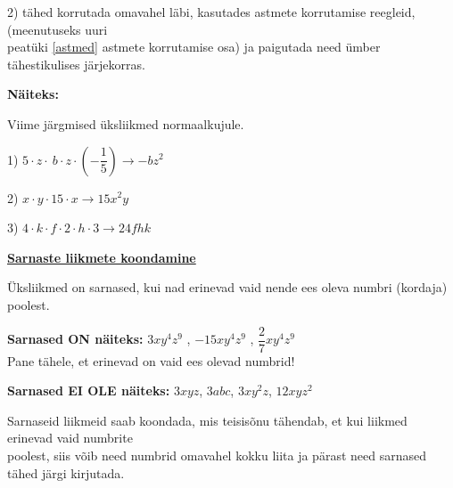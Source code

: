 \begin{center}
{{{\begin{flushleft}
\vspace{2mm}
\hspace{5mm}
2) tähed korrutada omavahel läbi, kasutades astmete korrutamise reegleid, (meenutuseks uuri\\ \hspace{5mm} peatüki \ref{astmed} astmete korrutamise osa) ja paigutada need ümber tähestikulises järjekorras.

\vspace{2mm}
\hspace{5mm}
\textbf{Näiteks:}

\vspace{2mm}
\hspace{5mm}
Viime järgmised üksliikmed normaalkujule.

\vspace{2mm}
\hspace{5mm}
1) $5 \cdot z \cdot \ b \cdot z \cdot \left( -\dfrac{1}{5} \right)  \longrightarrow -bz^{2}$

\vspace{2mm}
\hspace{5mm}
2) $x \cdot y \cdot 15 \cdot x \longrightarrow 15x^{2}y$

\vspace{2mm}
\hspace{5mm}
3) $4 \cdot k \cdot f \cdot 2 \cdot h \cdot 3 \longrightarrow 24fhk$


\vspace{5mm}
\hspace{5mm}
\textbf{\underline{Sarnaste liikmete koondamine}}

\vspace{2mm}
\hspace{5mm}
Üksliikmed on sarnased, kui nad erinevad vaid nende ees oleva numbri (kordaja) poolest. 

\vspace{2mm}
\hspace{5mm}
\textbf{Sarnased ON näiteks:} $3xy^{4}z^{9}$ , $-15xy^{4}z^{9}$ , $\dfrac{2}{7}xy^{4}z^{9}$\\
\hspace{5mm}
Pane tähele, et erinevad on vaid ees olevad numbrid!

\vspace{2mm}
\hspace{5mm}
\textbf{Sarnased EI OLE näiteks:} $3xyz$, $3abc$, $3xy^{2}z$, $12xyz^{2}$

\vspace{5mm}
\hspace{5mm}
Sarnaseid liikmeid saab koondada, mis teisisõnu tähendab, et kui liikmed erinevad vaid numbrite\\ \hspace{5mm} poolest, siis võib need numbrid omavahel kokku liita ja pärast need sarnased tähed järgi kirjutada.


\end{flushleft}}}}
\end{center}
